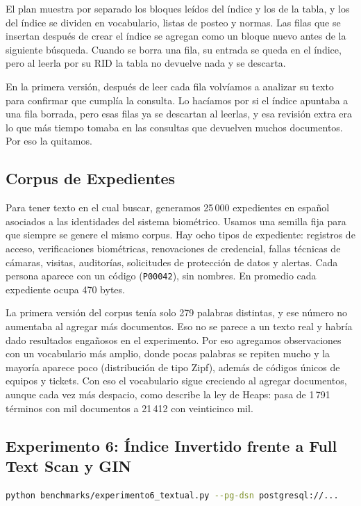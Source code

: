 \documentclass[a4paper,12pt]{article}
\begin{document}
El plan muestra por separado los bloques leídos del índice y los de la tabla, y
los del índice se dividen en vocabulario, listas de posteo y normas. Las filas
que se insertan después de crear el índice se agregan como un bloque nuevo antes
de la siguiente búsqueda. Cuando se borra una fila, su entrada se queda en el
índice, pero al leerla por su RID la tabla no devuelve nada y se descarta.

En la primera versión, después de leer cada fila volvíamos a analizar su texto
para confirmar que cumplía la consulta. Lo hacíamos por si el índice apuntaba a
una fila borrada, pero esas filas ya se descartan al leerlas, y esa revisión
extra era lo que más tiempo tomaba en las consultas que devuelven muchos
documentos. Por eso la quitamos.

\subsection{Corpus de Expedientes}

Para tener texto en el cual buscar, generamos 25\,000 expedientes en español
asociados a las identidades del sistema biométrico. Usamos una semilla fija para
que siempre se genere el mismo corpus. Hay ocho tipos de expediente: registros
de acceso, verificaciones biométricas, renovaciones de credencial, fallas
técnicas de cámaras, visitas, auditorías, solicitudes de protección de datos y
alertas. Cada persona aparece con un código (\texttt{P00042}), sin nombres. En
promedio cada expediente ocupa 470 bytes.

La primera versión del corpus tenía solo 279 palabras distintas, y ese número no
aumentaba al agregar más documentos. Eso no se parece a un texto real y habría
dado resultados engañosos en el experimento. Por eso agregamos observaciones con
un vocabulario más amplio, donde pocas palabras se repiten mucho y la mayoría
aparece poco (distribución de tipo Zipf), además de códigos únicos de equipos y
tickets. Con eso el vocabulario sigue creciendo al agregar documentos, aunque
cada vez más despacio, como describe la ley de Heaps: pasa de 1\,791 términos
con mil documentos a 21\,412 con veinticinco mil.

\subsection{Experimento 6: Índice Invertido frente a Full Text Scan y GIN}

\begin{lstlisting}[language=bash, caption={Ejecución del experimento}]
python benchmarks/experimento6_textual.py --pg-dsn postgresql://...
\end{lstlisting}
\end{document}
